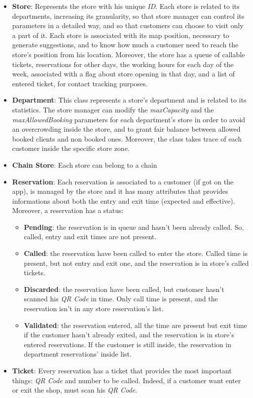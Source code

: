 \documentclass{article}
\begin{document}
\begin{itemize}
\begin{itemize}
				\end{itemize}
			
				\item {\bfseries Store}: Represents the store with his unique \emph{ID}. Each store is related to its departments, increasing its granularity, so that store manager can control its parameters in a detailed way, and so that customers can choose to visit only a part of it. Each store is associated with its map position, necessary to generate suggestions, and to know how much a customer need to reach the store's position from his location. Moreover, the store has a  queue of callable tickets, reservations for other days, the working hours for each day of the week, associated with a flag about store opening in that day, and a list of entered ticket, for contact tracking purposes.
				
				\item {\bfseries Department}: This class represents a store's department and is related to its statistics. The store manager can modify the \emph{maxCapacity} and the \emph{maxAllowedBooking} parameters for each department's store in order to avoid an overcrowding inside the store, and to grant fair balance between allowed booked clients and non booked ones. Moreover, the class takes trace of each customer inside the specific store zone.
				
				\item {\bfseries Chain Store}: Each store can belong to a chain
				\newpage
				\item {\bfseries Reservation}: Each reservation is associated to a customer (if got on the app), is managed by the store and it has many attributes that provides informations about both the entry and exit time (expected and effective). Moreover, a reservation has a status:
				\begin{itemize}
					\item {\bfseries Pending}: the reservation is in queue and hasn't been already called. So, called, entry and exit times are not present.
					\item {\bfseries Called}: the reservation have been called to enter the store. Called time is present, but not entry and exit one, and the reservation is in store's called tickets.
					\item {\bfseries Discarded}: the reservation have been called, but customer hasn't scanned his \emph{QR Code} in time. Only call time is present, and the reservation isn't in any store reservation's list.
					\item {\bfseries Validated}: the reservation entered, all the time are present but exit time if the customer hasn't already exited, and the reservation is in store's entered reservations. If the customer is still inside, the reservation in department reservations' inside list.
				\end{itemize}
				
				\item {\bfseries Ticket}: Every reservation has a ticket that provides the most important things: \emph{QR Code} and number to be called. Indeed, if a customer want enter or exit the shop, must scan his \emph{QR Code}.
			\end{itemize}
		
\end{document}
